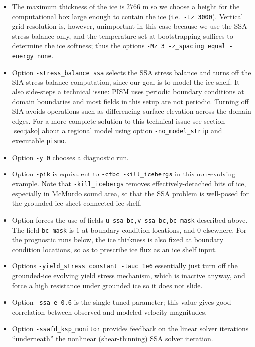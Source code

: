 \begin{itemize}
\item The maximum thickness of the ice is $2766$ m so we choose a height for the computational box large enough to contain the ice (i.e.~\texttt{-Lz 3000}).  Vertical grid resolution is, however, unimportant in this case because we use the SSA stress balance only, and the temperature set at bootstrapping suffices to determine the ice softness; thus the options \texttt{-Mz 3 -z_spacing equal -energy none}.

\item Option \texttt{-stress_balance ssa} selects the SSA stress balance and turns off the SIA stress balance computation, since our goal is to model the ice shelf.  It also side-steps a technical issue: PISM uses periodic boundary conditions at domain boundaries and most fields in this setup are not periodic.  Turning off SIA avoids operations such as differencing surface elevation across the domain edges.  For a more complete solution to this technical issue see section \ref{sec:jako} about a regional model using option \verb|-no_model_strip| and executable \verb|pismo|.

\item Option \texttt{-y 0} chooses a diagnostic run.

\item Option \texttt{-pik} is equivalent to \texttt{-cfbc -kill_icebergs} in this non-evolving example.  Note that \texttt{-kill_icebergs} removes effectively-detached bits of ice, especially in McMurdo sound area, so that the SSA problem is well-posed for the grounded-ice-sheet-connected ice shelf.

\item Option  forces the use of fields \texttt{u_ssa_bc,v_ssa_bc,bc_mask} described above.  The field \texttt{bc_mask} is $1$ at boundary condition locations, and $0$ elsewhere.  For the prognostic runs below, the ice thickness is also fixed at boundary condition locations, so as to prescribe ice flux as an ice shelf input.

\item Options \texttt{-yield_stress constant -tauc 1e6} essentially just turn off the grounded-ice evolving yield stress mechanism, which is inactive anyway, and force a high resistance under grounded ice so it does not slide.  

\item Option \texttt{-ssa_e 0.6} is the single tuned parameter; this value gives good correlation between observed and modeled velocity magnitudes.

\item Option \texttt{-ssafd_ksp_monitor} provides feedback on the linear solver iterations ``underneath'' the nonlinear (shear-thinning) SSA solver iteration.
\end{itemize}


